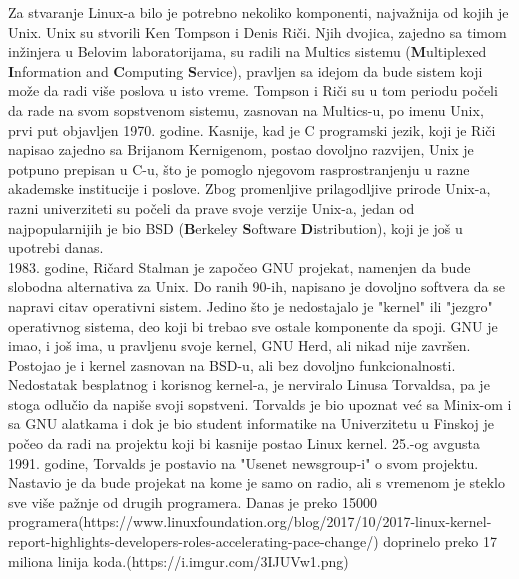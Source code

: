 Za stvaranje Linux-a bilo je potrebno nekoliko komponenti, najvažnija od kojih je Unix. Unix su stvorili Ken Tompson i Denis Riči. Njih dvojica, zajedno sa timom inžinjera u Belovim laboratorijama, su radili na Multics sistemu (\textbf{M}ultiplexed \textbf{I}nformation and \textbf{C}omputing \textbf{S}ervice), pravljen sa idejom da bude sistem koji može da radi više poslova u isto vreme. Tompson i Riči su u  tom periodu počeli da rade na svom sopstvenom sistemu, zasnovan na Multics-u, po imenu Unix, prvi put objavljen 1970. godine. Kasnije, kad je C programski jezik, koji je Riči napisao zajedno sa Brijanom Kernigenom, postao dovoljno razvijen, Unix je potpuno prepisan u C-u, što je pomoglo njegovom rasprostranjenju u razne akademske institucije i poslove. Zbog promenljive prilagodljive prirode Unix-a, razni univerziteti su počeli da prave svoje verzije Unix-a, jedan od najpopularnijih je bio BSD (\textbf{B}erkeley \textbf{S}oftware \textbf{D}istribution), koji je još u upotrebi danas.\\

1983. godine, Ričard Stalman je započeo GNU projekat, namenjen da bude\cite{https://www.gnu.org/philosophy/free-sw.html} slobodna alternativa za Unix. Do ranih 90-ih, napisano je dovoljno softvera da se napravi citav operativni sistem. Jedino što je nedostajalo je "kernel" ili "jezgro" operativnog sistema, deo koji bi trebao sve ostale komponente da spoji. GNU je imao, i još ima, u pravljenu svoje kernel, GNU Herd, ali nikad nije završen. Postojao je i kernel zasnovan na BSD-u, ali bez dovoljno funkcionalnosti.\\

Nedostatak besplatnog i korisnog kernel-a, je nerviralo Linusa Torvaldsa, pa je stoga odlučio da napiše svoji sopstveni. Torvalds je bio upoznat već sa Minix-om i sa GNU alatkama i dok je bio student informatike na Univerzitetu u Finskoj je počeo da radi na projektu koji bi kasnije postao Linux kernel. 25.-og avgusta 1991. godine, Torvalds je postavio na "Usenet newsgroup-i" o svom projektu. Nastavio je da bude projekat na kome je samo on radio, ali s vremenom je steklo sve više pažnje od drugih programera. Danas je preko 15000 programera(https://www.linuxfoundation.org/blog/2017/10/2017-linux-kernel-report-highlights-developers-roles-accelerating-pace-change/) doprinelo preko 17 miliona linija koda.(https://i.imgur.com/3IJUVw1.png)